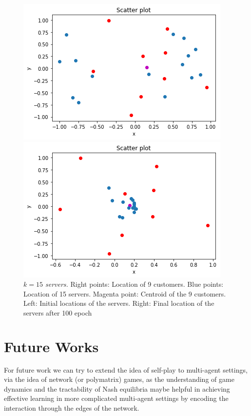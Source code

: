 \documentclass{article}
\begin{document}
\begin{figure}[!ht]
	\begin{minipage}{0.5\linewidth}
		\centering
		\includegraphics[scale=0.3]{15s0}
	\end{minipage}%
	\begin{minipage}{0.5\linewidth}
		\centering
		\includegraphics[scale=0.3]{15s10}
	\end{minipage}%
	\caption{\textit{$k=15$ servers.} Right points: Location of 9 customers. Blue points: Location of 15 servers. Magenta point: Centroid of the 9 customers. Left: Initial locations of the servers. Right: Final location of the servers after 100 epoch}
		\label{fig:15s}
	\end{figure}


\newpage
\section{Future Works}
For future work we can try to extend the idea of self-play to multi-agent settings, via the idea of network (or polymatrix) games, as the understanding of game dynamics \cite{piliouras2014optimization,nagarajan2018three} and the tractability of Nash equilibria \cite{cai2016zero} maybe helpful in achieving effective learning in more complicated multi-agent settings by encoding the interaction through the edges of the network.
\end{document}
